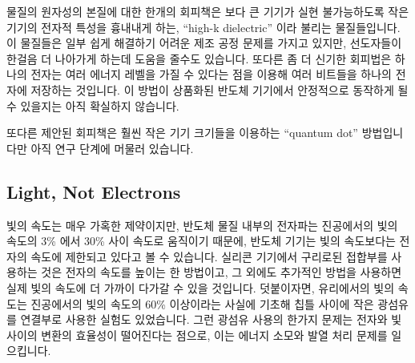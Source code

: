 \iffalse
Stephen Hawking is said to have claimed that semiconductor manufacturers
have but two fundamental problems: (1) the finite speed of light and
(2) the atomic nature of matter~\cite{BryanGardiner2007}.
It is possible that semiconductor manufacturers are approaching these
limits, but there are nevertheless a few avenues of research and
development focused on working around these fundamental limits.
\fi

물질의 원자성의 본질에 대한 한개의 회피책은 보다 큰 기기가 실현 불가능하도록
작은 기기의 전자적 특성을 흉내내게 하는, ``high-k dielectric'' 이라 불리는
물질들입니다.
이 물질들은 일부 쉽게 해결하기 어려운 제조 공정 문제를 가지고 있지만,
선도자들이 한걸음 더 나아가게 하는데 도움을 줄수도 있습니다.
또다른 좀 더 신기한 회피법은 하나의 전자는 여러 에너지 레벨을 가질 수 있다는
점을 이용해 여러 비트들을 하나의 전자에 저장하는 것입니다.
이 방법이 상품화된 반도체 기기에서 안정적으로 동작하게 될 수 있을지는 아직
확실하지 않습니다.

또다른 제안된 회피책은 훨씬 작은 기기 크기들을 이용하는 ``quantum dot''
방법입니다만 아직 연구 단계에 머물러 있습니다.

\iffalse
One workaround for the atomic nature of matter are so-called
``high-K dielectric'' materials, which allow larger devices to mimic the
electrical properties of infeasibly small devices.
These materials pose some severe fabrication challenges, but nevertheless
may help push the frontiers out a bit farther.
Another more-exotic workaround stores multiple bits in a single electron,
relying on the fact that a given electron can exist at a number of
energy levels.
It remains to be seen if this particular approach can be made to work
reliably in production semiconductor devices.

Another proposed workaround is the ``quantum dot'' approach that
allows much smaller device sizes, but which is still in the research
stage.
\fi

\subsection{Light, Not Electrons}
\label{sec:cpu:Light, Not Electrons}

빛의 속도는 매우 가혹한 제약이지만, 반도체 물질 내부의 전자파는 진공에서의 빛의
속도의 3\% 에서 30\% 사이 속도로 움직이기 때문에, 반도체 기기는 빛의 속도보다는
전자의 속도에 제한되고 있다고 볼 수 있습니다.
실리콘 기기에서 구리로된 접합부를 사용하는 것은 전자의 속도를 높이는 한
방법이고, 그 외에도 추가적인 방법을 사용하면 실제 빛의 속도에 더 가까이 다가갈
수 있을 것입니다.
덧붙이자면, 유리에서의 빛의 속도는 진공에서의 빛의 속도의 60\% 이상이라는
사실에 기초해 칩틀 사이에 작은 광섬유를 연결부로 사용한 실험도 있었습니다.
그런 광섬유 사용의 한가지 문제는 전자와 빛 사이의 변환의 효율성이 떨어진다는
점으로, 이는 에너지 소모와 발열 처리 문제를 일으킵니다.

